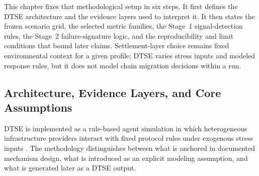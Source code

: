 This chapter fixes that methodological setup in six steps. It first defines the DTSE architecture and the evidence layers used to interpret it. It then states the frozen scenario grid, the selected metric families, the Stage~1 signal-detection rules, the Stage~2 failure-signature logic, and the reproducibility and limit conditions that bound later claims. Settlement-layer choice remains fixed environmental context for a given profile; DTSE varies stress inputs and modeled response rules, but it does not model chain migration decisions within a run.

\subsection{Architecture, Evidence Layers, and Core Assumptions}
\label{subsec:dtse_model_overview_assumptions}
DTSE is implemented as a rule-based agent simulation in which heterogeneous infrastructure providers interact with fixed protocol rules under exogenous stress inputs \cite{Collins2024, McCulloch2022}. The methodology distinguishes between what is anchored in documented mechanism design, what is introduced as an explicit modeling assumption, and what is generated later as a DTSE output.

